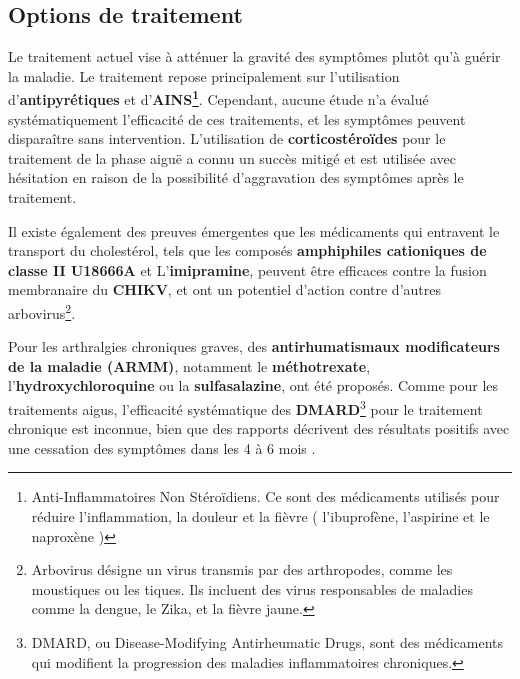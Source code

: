 \subsection{Options de traitement}
Le traitement actuel vise à atténuer la gravité des symptômes plutôt qu'à guérir la maladie. Le traitement repose principalement sur l'utilisation d'\textbf{antipyrétiques} et d'\textbf{AINS\footnote{Anti-Inflammatoires Non Stéroïdiens. Ce sont des médicaments utilisés pour réduire l'inflammation, la douleur et la fièvre ( l'ibuprofène, l'aspirine et le naproxène )}}. Cependant, aucune étude n'a évalué systématiquement l'efficacité de ces traitements, et les symptômes peuvent disparaître sans intervention. L'utilisation de \textbf{corticostéroïdes} pour le traitement de la phase aiguë a connu un succès mitigé et est utilisée avec hésitation en raison de la possibilité d'aggravation des symptômes après le traitement. 

Il existe également des preuves émergentes que les médicaments qui entravent le transport du cholestérol, tels que les composés \textbf{amphiphiles cationiques de classe II U18666A} et L'\textbf{imipramine}, peuvent être efficaces contre la fusion membranaire du \textbf{CHIKV}, et ont un potentiel d'action contre d'autres arbovirus\footnote{Arbovirus désigne un virus transmis par des arthropodes, comme les moustiques ou les tiques. Ils incluent des virus responsables de maladies comme la dengue, le Zika, et la fièvre jaune.}.


Pour les arthralgies chroniques graves, des \textbf{antirhumatismaux modificateurs de la maladie (ARMM)}, notamment le \textbf{méthotrexate}, l'\textbf{hydroxychloroquine} ou la \textbf{sulfasalazine}, ont été proposés. Comme pour les traitements aigus, l'efficacité systématique des \textbf{DMARD}\footnote{DMARD, ou Disease-Modifying Antirheumatic Drugs, sont des médicaments qui modifient la progression des maladies inflammatoires chroniques.} pour le traitement chronique est inconnue, bien que des rapports décrivent des résultats positifs avec une cessation des symptômes dans les 4 à 6 mois \cite{ganesan2017chikungunya}.

\newpage

